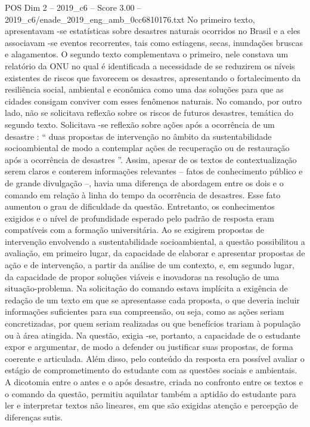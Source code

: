 \begin{textsample}{POS Dim 2 – 2019\_c6 – Score 3.00 – 2019\_c6/enade\_2019\_eng\_amb\_0cc6810176.txt}
No primeiro texto, apresentavam -se estatísticas sobre desastres naturais ocorridos no Brasil e a eles associavam -se eventos recorrentes, tais como estiagens, secas, inundações bruscas e alagamentos.
O segundo texto complementava o primeiro, nele constava um relatório da ONU no qual é identificada a necessidade de se reduzirem os níveis existentes de riscos que favorecem os desastres, apresentando o fortalecimento da resiliência social, ambiental e econômica como uma das soluções para que as cidades consigam conviver com esses fenômenos naturais.
No comando, por outro lado, não se solicitava reflexão sobre os riscos de futuros desastres, temática do segundo texto.
Solicitava -se reflexão sobre ações após a ocorrência de um desastre : “ duas propostas de intervenção no âmbito da sustentabilidade socioambiental de modo a contemplar ações de recuperação ou de restauração após a ocorrência de desastres ”.
Assim, apesar de os textos de contextualização serem claros e conterem informações relevantes – fatos de conhecimento público e de grande divulgação –, havia uma diferença de abordagem entre os dois e o comando em relação à linha do tempo da ocorrência de desastres.
Esse fato aumentou o grau de dificuldade da questão.
Entretanto, os conhecimentos exigidos e o nível de profundidade esperado pelo padrão de resposta eram compatíveis com a formação universitária.
Ao se exigirem propostas de intervenção envolvendo a sustentabilidade socioambiental, a questão possibilitou a avaliação, em primeiro lugar, da capacidade de elaborar e apresentar propostas de ação e de intervenção, a partir da análise de um contexto, e, em segundo lugar, da capacidade de propor soluções viáveis e inovadoras na resolução de uma situação-problema.
Na solicitação do comando estava implícita a exigência de redação de um texto em que se apresentasse cada proposta, o que deveria incluir informações suficientes para sua compreensão, ou seja, como as ações seriam concretizadas, por quem seriam realizadas ou que benefícios trariam à população ou à área atingida.
Na questão, exigia -se, portanto, a capacidade de o estudante expor e argumentar, de modo a defender ou justificar suas propostas, de forma coerente e articulada.
Além disso, pelo conteúdo da resposta era possível avaliar o estágio de comprometimento do estudante com as questões sociais e ambientais.
A dicotomia entre o antes e o após desastre, criada no confronto entre os textos e o comando da questão, permitiu aquilatar também a aptidão do estudante para ler e interpretar textos não lineares, em que são exigidas atenção e percepção de diferenças sutis.

\end{textsample}
